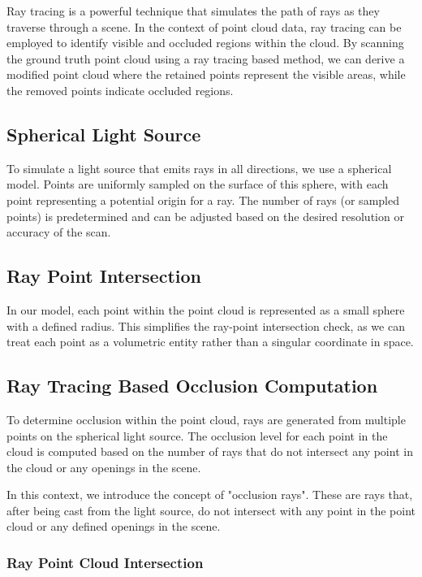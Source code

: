 \documentclass[11pt, a4paper,oneside,chapterprefix=false]{scrbook}
\begin{document}
Ray tracing is a powerful technique that simulates the path of rays as they traverse through a scene. In the context of point cloud data, ray tracing can be employed to identify visible and occluded regions within the cloud. By scanning the ground truth point cloud using a ray tracing based method, we can derive a modified point cloud where the retained points represent the visible areas, while the removed points indicate occluded regions.

\subsection{Spherical Light Source}

To simulate a light source that emits rays in all directions, we use a spherical model. Points are uniformly sampled on the surface of this sphere, with each point representing a potential origin for a ray. The number of rays (or sampled points) is predetermined and can be adjusted based on the desired resolution or accuracy of the scan.

\subsection{Ray Point Intersection}

In our model, each point within the point cloud is represented as a small sphere with a defined radius. This simplifies the ray-point intersection check, as we can treat each point as a volumetric entity rather than a singular coordinate in space.

\subsection{Ray Tracing Based Occlusion Computation}

To determine occlusion within the point cloud, rays are generated from multiple points on the spherical light source. The occlusion level for each point in the cloud is computed based on the number of rays that do not intersect any point in the cloud or any openings in the scene.

In this context, we introduce the concept of "occlusion rays". These are rays that, after being cast from the light source, do not intersect with any point in the point cloud or any defined openings in the scene.

\subsubsection{Ray Point Cloud Intersection}
\end{document}
